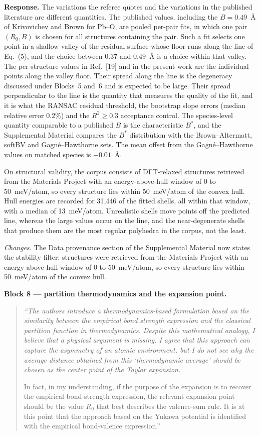 \documentclass[11pt]{article}
\newenvironment{refquote}%
  {\begin{quote}\itshape\color{black!70}}%
  {\end{quote}}
\begin{document}
\textbf{Response.}  The variations the referee quotes and the
variations in the published literature are different quantities.
The published values, including the $B=0.49$~\AA{} of Krivovichev and
Brown for Pb--O, are pooled per-pair fits, in which one pair
$(R_0,B)$ is chosen for all structures containing the pair.  Such a
fit selects one point in a shallow valley of the residual surface
whose floor runs along the line of Eq.~(5), and the choice between
$0.37$ and $0.49$~\AA{} is a choice within that valley.  The
per-structure values in Ref.~[19] and in the present work are the
individual points along the valley floor.  Their spread along the
line is the degeneracy discussed under Blocks~5 and~6 and is
expected to be large.  Their spread perpendicular to the line is the
quantity that measures the quality of the fit, and it is what the
RANSAC residual threshold, the bootstrap slope errors (median
relative error $0.2\%$) and the $R^2\ge0.3$ acceptance control.  The
species-level quantity comparable to a published $B$ is the
characteristic $B^*$, and the Supplemental Material compares the
$B^*$ distribution with the Brown--Altermatt, softBV and
Gagn\'e--Hawthorne sets.  The mean offset from the
Gagn\'e--Hawthorne values on matched species is $-0.01$~\AA.

On structural validity, the corpus consists of DFT-relaxed
structures retrieved from the Materials Project with an
energy-above-hull window of 0 to 50~meV/atom, so every structure lies
within 50~meV/atom of the convex hull.  Hull energies are recorded
for 31{,}446 of the fitted shells, all within that window, with a
median of 13~meV/atom. Unrealistic shells move points off the predicted line, whereas the large
values occur on the line, and the near-degenerate shells that
produce them are the most regular polyhedra in the corpus, not the
least.

\emph{Changes.}  The Data provenance section of the Supplemental
Material now states the stability filter: structures were retrieved
from the Materials Project with an energy-above-hull window of 0 to
50~meV/atom, so every structure lies within 50~meV/atom of the convex
hull.

\textbf{Block 8 --- partition thermodynamics and the expansion
point.}

\begin{refquote}
``The authors introduce a thermodynamics-based formulation based on
the similarity between the empirical bond strength expression and the
classical partition function in thermodynamics.  Despite this
mathematical analogy, I believe that a physical argument is missing.
I agree that this approach can capture the asymmetry of an atomic
environment, but I do not see why the average distance obtained from
this `thermodynamic average' should be chosen as the center point of
the Taylor expansion.

In fact, in my understanding, if the purpose of the expansion is to
recover the empirical bond-strength expression, the relevant
expansion point should be the value $R_0$ that best describes the
valence-sum rule.  It is at this point that the approach based on the
Yukawa potential is identified with the empirical bond-valence
expression.''
\end{refquote}
\end{document}
